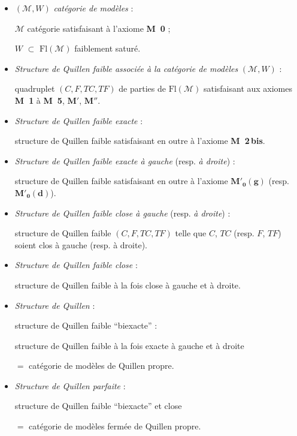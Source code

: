 \documentclass[11pt]{article}
\newcommand{\printedpage}[1]{\marginpar{\footnotesize p.~#1}}
\newcommand{\Fl}{\mathrm{Fl}}
\newcommand{\Mo}{\mathcal{M}}
\newcommand{\Mzg}{$\mathbf{M}'_{\mathbf{0}}\mathbf{(g)}$}
\newcommand{\Mzd}{$\mathbf{M}'_{\mathbf{0}}\mathbf{(d)}$}
\begin{document}
\begin{itemize}
\item[\textbullet] $(\Mo,W)$ \textit{catégorie de modèles} :

$\Mo$ catégorie satisfaisant à l'axiome \textbf{M~0} ;

$W$ $\subset$ $\Fl(\Mo)$ faiblement saturé.

\item[\textbullet] \textit{Structure de Quillen faible associée à la catégorie de modèles} $(\Mo,W)$ :

quadruplet $(C,F,TC,TF)$ de parties de $\Fl(\Mo)$ satisfaisant aux axiomes \textbf{M~1} à \textbf{M~5}, $\mathbf{M}'$, $\mathbf{M}''$.

\item[\textbullet] \textit{Structure de Quillen faible exacte} :

structure de Quillen faible satisfaisant en outre à l'axiome \textbf{M~2\,bis}.

\item[\textbullet] \textit{Structure de Quillen faible exacte à gauche} (resp. \textit{à droite}) :

structure de Quillen faible satisfaisant en outre à l'axiome \Mzg{} (resp. \Mzd).
\end{itemize}

\printedpage{61}

\begin{itemize}
\item[\textbullet] \textit{Structure de Quillen faible close à gauche} (resp. \textit{à droite}) :

structure de Quillen faible $(C,F,TC,TF)$ telle que $C$, $TC$ (resp. $F$, $TF$) soient clos à gauche (resp. à droite).

\item[\textbullet] \textit{Structure de Quillen faible close} :

structure de Quillen faible à la fois close à gauche et à droite.

\item[\textbullet] \textit{Structure de Quillen} :

structure de Quillen faible “biexacte” :

structure de Quillen faible à la fois exacte à gauche et à droite

$=$ catégorie de modèles de Quillen propre.

\item[\textbullet] \textit{Structure de Quillen parfaite} :

structure de Quillen faible “biexacte” et close

$=$ catégorie de modèles fermée de Quillen propre.
\end{itemize}
\end{document}
